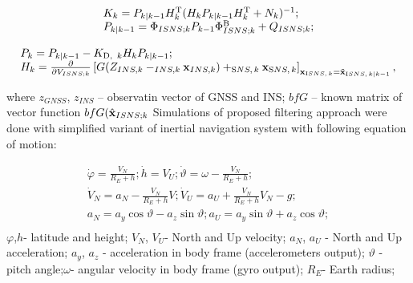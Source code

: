 \documentclass[conference, utf8]{IEEEtran}
\begin{document}
\[\begin{array}{l} {K_{k} =P_{k|k-1} H_{k}^{{\rm T}} (H_{k} P_{k|k-1} H_{k}^{{\rm T}} +N_{k} )^{-1} ;} \\ 
{P_{k|k-1} =\Phi_{ISNS;k} P_{k-1} \Phi_{ISNS;k}^{{\rm B}} +Q_{ISNS;k} ;} \end{array}\] 

\[\begin{array}{l} {P_{k} =P_{k|k-1} -K_{{\rm D,}\, \, \, k} H_{k} P_{k|k-1} ;} \\ 
{H_{k} =\frac{\partial }{\partial V_{ISNS;k} } \left[G(Z_{INS,k} -_{INS,k} {\bf x}_{INS,k} )+_{{\rm S}NS,\, k} 
{\bf x}_{{\rm S}NS,\, k} \right]_{{\bf x}_{{\rm I}SNS,\, k} =\tilde{{\bf x}}_{{\rm I}SNS,\, k|k-1} } ,} \end{array}\] 

where $z_{GNSS}$, $z_{INS}$ -- observatin vector of GNSS and INS; ${bf G}$ -- known matrix of vector function ${bf G}(\hat{{\bf x}}_{ISNS;k} $
Simulations of proposed filtering approach were done with simplified variant of inertial navigation system with following equation of motion:


\begin{equation}
\begin{array}{l}
  \displaystyle \dot{\varphi }=\frac{V_{N} }{R_{E} +h} ; \dot{h}=V_{U} ; \dot{\vartheta }=\omega -\frac{V_{N} }{R_{E} +h} ;\\
  \displaystyle \dot{V}_{N} =a_{N} -\frac{V_{N} }{R_{E} +h} V; \dot{V}_{U} =a_{U} +\frac{V_{N} }{R_{E} +h} V_{N} -g;\\
  \displaystyle a_{N} =a_{y} \cos \vartheta -a_{z} \sin \vartheta ; a_{U} =a_{y} \sin \vartheta +a_{z} \cos \vartheta ;\\
  \end{array} 
  \label{eq:ins}
\end{equation}
$\varphi$,$h$- latitude and height; 
$V_{N}$, $V_{U}$- North and Up velocity; 
$a_{N}$, $a_{U}$ - North and Up acceleration; 
$a_{y}$, $a_{z}$ - acceleration in body frame (accelerometers output); 
$\vartheta$ - pitch angle;$\omega $- angular velocity in body frame (gyro output); 
$R_{E}$- Earth radius;
\end{document}
